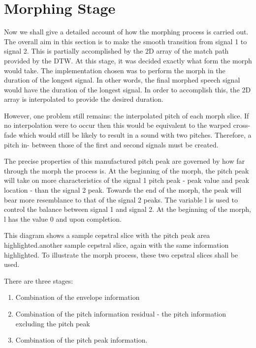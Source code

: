 \documentclass[12pt]{report}
\begin{document}
\section{ Morphing Stage}
Now we shall give a detailed account of how the morphing process is carried out. The overall aim in this section is to make the smooth transition from signal 1 to signal 2. This is partially accomplished by the 2D array of the match path provided by the DTW. At this stage, it was decided exactly what form the morph would take. The implementation chosen was to perform the morph in the duration of the longest signal.  In other words, the final morphed speech signal would have the duration of the longest signal. In order to accomplish this, the 2D array is interpolated to provide the desired duration.
\newline

However, one problem still remains: the interpolated pitch of each morph slice. If no interpolation were to occur then this would be equivalent to the warped cross-fade which would still be likely to result in a sound with two pitches. Therefore, a pitch in- between those of the first and second signals must be created.
\newline


 The precise properties of this manufactured pitch peak are governed by how far through the morph the process is. At the beginning of the morph, the pitch peak will take on more characteristics of the signal 1 pitch peak - peak value and peak location - than the signal 2 peak. Towards the end of the morph, the peak will bear more resemblance to that of the signal 2 peaks. The variable l is used to control the balance between signal 1 and signal 2. At the beginning of the morph, l has the value 0 and upon completion.
\newline

 This diagram shows a sample cepstral slice with the pitch peak area highlighted.another sample cepstral slice, again with the same information highlighted. To illustrate the morph process, these two cepstral slices shall be used.
\newline

There are three stages:
\newline

\begin{enumerate}
\item Combination of the envelope information
\item Combination of the pitch information residual - the pitch information excluding the pitch peak
\item Combination of the pitch peak information.
\end{enumerate}
\end{document}
